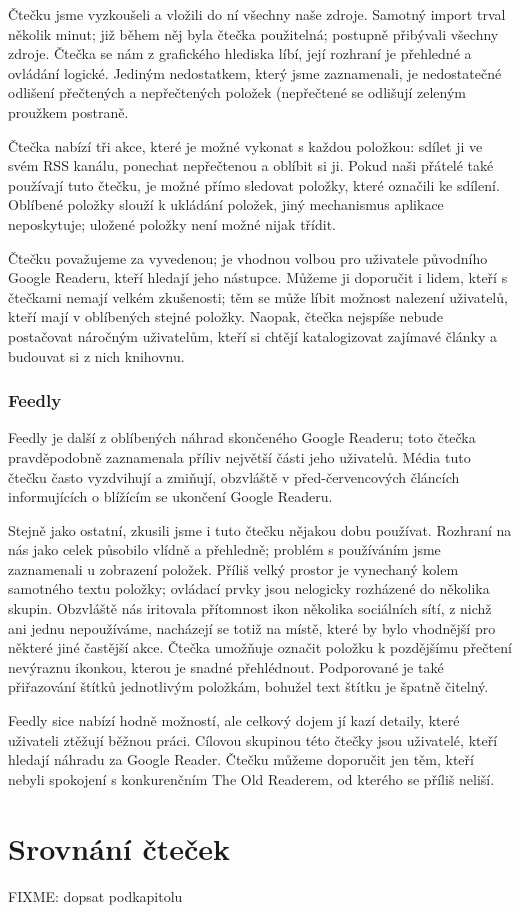Čtečku jsme vyzkoušeli a vložili do ní všechny naše zdroje.
Samotný import trval několik minut; již během něj byla čtečka použitelná; postupně přibývali všechny zdroje.
Čtečka se nám z grafického hlediska líbí, její rozhraní je přehledné a ovládání logické.
Jediným nedostatkem, který jsme zaznamenali, je nedostatečné odlišení přečtených a nepřečtených položek (nepřečtené se odlišují zeleným proužkem postraně.

Čtečka nabízí tři akce, které je možné vykonat s každou položkou: sdílet ji ve svém RSS kanálu, ponechat nepřečtenou a oblíbit si ji.
Pokud naši přátelé také používají tuto čtečku, je možné přímo sledovat položky, které označili ke sdílení.
Oblíbené položky slouží k ukládání položek, jiný mechanismus aplikace neposkytuje; uložené položky není možné nijak třídit.

Čtečku považujeme za vyvedenou; je vhodnou volbou pro uživatele původního Google Readeru, kteří hledají jeho nástupce.
Můžeme ji doporučit i lidem, kteří s čtečkami nemají velkém zkušenosti; těm se může líbit možnost nalezení uživatelů, kteří mají v oblíbených stejné položky.
Naopak, čtečka nejspíše nebude postačovat náročným uživatelům, kteří si chtějí katalogizovat zajímavé články a budouvat si z nich knihovnu.

\subsubsection{Feedly}

Feedly je další z oblíbených náhrad skončeného Google Readeru; toto čtečka pravděpodobně zaznamenala příliv největší části jeho uživatelů.
Média tuto čtečku často vyzdvihují a zmiňují, obzvláště v před-červencových článcích informujících o blížícím se ukončení Google Readeru.

Stejně jako ostatní, zkusili jsme i tuto čtečku nějakou dobu používat.
Rozhraní na nás jako celek působilo vlídně a přehledně; problém s používáním jsme zaznamenali u zobrazení položek.
Příliš velký prostor je vynechaný kolem samotného textu položky; ovládací prvky jsou nelogicky rozházené do několika skupin.
Obzvláště nás iritovala přítomnost ikon několika sociálních sítí, z nichž ani jednu nepoužíváme, nacházejí se totiž na místě, které by bylo vhodnější pro některé jiné častější akce.
Čtečka umožňuje označit položku k pozdějšímu přečtení nevýraznu ikonkou, kterou je snadné přehlédnout.
Podporované je také přiřazování štítků jednotlivým položkám, bohužel text štítku je špatně čitelný.

Feedly sice nabízí hodně možností, ale celkový dojem jí kazí detaily, které uživateli ztěžují běžnou práci.
Cílovou skupinou této čtečky jsou uživatelé, kteří hledají náhradu za Google Reader.
Čtečku můžeme doporučit jen těm, kteří nebyli spokojení s konkurenčním The Old Readerem, od kterého se příliš neliší.

\section{Srovnání čteček}

FIXME: dopsat podkapitolu
